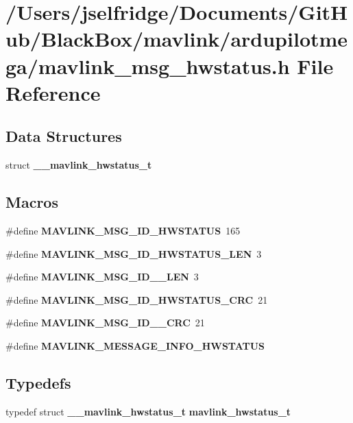 \section{/\+Users/jselfridge/\+Documents/\+Git\+Hub/\+Black\+Box/mavlink/ardupilotmega/mavlink\+\_\+msg\+\_\+hwstatus.h File Reference}
\label{mavlink__msg__hwstatus_8h}
\subsection*{Data Structures}
\begin{DoxyCompactItemize}
\item 
struct \textbf{ \+\_\+\+\_\+mavlink\+\_\+hwstatus\+\_\+t}
\end{DoxyCompactItemize}
\subsection*{Macros}
\begin{DoxyCompactItemize}
\item 
\#define \textbf{ M\+A\+V\+L\+I\+N\+K\+\_\+\+M\+S\+G\+\_\+\+I\+D\+\_\+\+H\+W\+S\+T\+A\+T\+US}~165
\item 
\#define \textbf{ M\+A\+V\+L\+I\+N\+K\+\_\+\+M\+S\+G\+\_\+\+I\+D\+\_\+\+H\+W\+S\+T\+A\+T\+U\+S\+\_\+\+L\+EN}~3
\item 
\#define \textbf{ M\+A\+V\+L\+I\+N\+K\+\_\+\+M\+S\+G\+\_\+\+I\+D\+\_\+\_\+\+L\+EN}~3
\item 
\#define \textbf{ M\+A\+V\+L\+I\+N\+K\+\_\+\+M\+S\+G\+\_\+\+I\+D\+\_\+\+H\+W\+S\+T\+A\+T\+U\+S\+\_\+\+C\+RC}~21
\item 
\#define \textbf{ M\+A\+V\+L\+I\+N\+K\+\_\+\+M\+S\+G\+\_\+\+I\+D\+\_\+\_\+\+C\+RC}~21
\item 
\#define \textbf{ M\+A\+V\+L\+I\+N\+K\+\_\+\+M\+E\+S\+S\+A\+G\+E\+\_\+\+I\+N\+F\+O\+\_\+\+H\+W\+S\+T\+A\+T\+US}
\end{DoxyCompactItemize}
\subsection*{Typedefs}
\begin{DoxyCompactItemize}
\item 
typedef struct \textbf{ \+\_\+\+\_\+mavlink\+\_\+hwstatus\+\_\+t} \textbf{ mavlink\+\_\+hwstatus\+\_\+t}
\end{DoxyCompactItemize}


